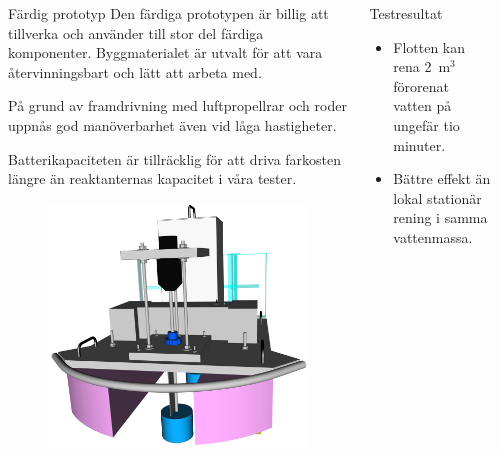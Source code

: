 \documentclass[final]{beamer}
\newlength{\onecolwid}
\begin{document}
\begin{frame}[t]
\begin{columns}[t, totalwidth=\textwidth]
\begin{column}{\onecolwid}
    \end{column}
    \begin{column}{\onecolwid}

      \begin{block}{Färdig prototyp}
        Den färdiga prototypen är billig att tillverka och använder till stor del
        färdiga komponenter. Byggmaterialet är utvalt för att vara återvinningsbart
        och lätt att arbeta med.

        På grund av framdrivning med luftpropellrar och roder uppnås god manöverbarhet
        även vid låga hastigheter.

        Batterikapaciteten är tillräcklig för att driva farkosten längre än reaktanternas
        kapacitet i våra tester.

        \vskip 0cm
        \begin{figure}[H]
          \centering
          \hbox{\hspace{-3cm}\includegraphics[width=25cm]{figures/front_rbr.png}}
        \end{figure}
      \end{block}

    \end{column}
    \begin{column}{\onecolwid}

      \begin{block}{Testresultat}
        \begin{itemize}
        \item Flotten kan rena 2~m$^3$ förorenat vatten på ungefär tio minuter.
        \item Bättre effekt än lokal stationär rening i samma vattenmassa.
        \end{itemize}


\end{block}
\end{column}
\end{columns}
\end{frame}
\end{document}
